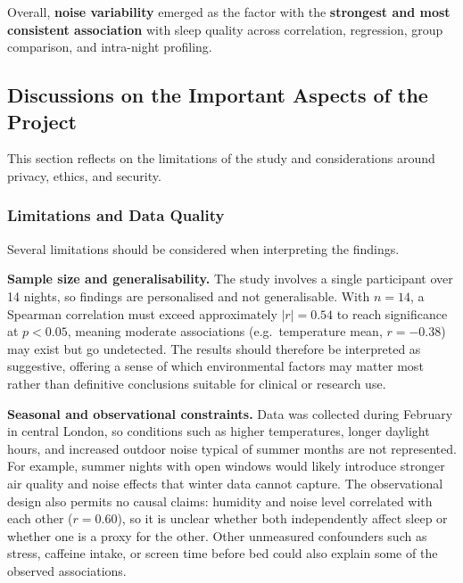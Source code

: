 \documentclass[10pt,a4paper]{extarticle}
\begin{document}
\begin{tcolorbox}[
  colback=imperialblue!5,
  colframe=imperialblue,
  leftrule=3pt,
  rightrule=0pt,
  toprule=0pt,
  bottomrule=0pt,
  boxsep=4pt,
  left=8pt,
  right=8pt,
  sharp corners
]
Overall, \textbf{noise variability} emerged as the factor with the \textbf{strongest and most consistent association} with sleep quality across correlation, regression, group comparison, and intra-night profiling.
\end{tcolorbox}

\subsection{Discussions on the Important Aspects of the Project}

This section reflects on the limitations of the study and considerations around privacy, ethics, and security.

\subsubsection{Limitations and Data Quality}

Several limitations should be considered when interpreting the findings.

\textbf{Sample size and generalisability.} The study involves a single participant over 14 nights, so findings are personalised and not generalisable. With $n = 14$, a Spearman correlation must exceed approximately $|r| = 0.54$ to reach significance at $p < 0.05$, meaning moderate associations (e.g.\ temperature mean, $r = -0.38$) may exist but go undetected. The results should therefore be interpreted as suggestive, offering a sense of which environmental factors may matter most rather than definitive conclusions suitable for clinical or research use.

\textbf{Seasonal and observational constraints.} Data was collected during February in central London, so conditions such as higher temperatures, longer daylight hours, and increased outdoor noise typical of summer months are not represented. For example, summer nights with open windows would likely introduce stronger air quality and noise effects that winter data cannot capture. The observational design also permits no causal claims: humidity and noise level correlated with each other ($r = 0.60$), so it is unclear whether both independently affect sleep or whether one is a proxy for the other. Other unmeasured confounders such as stress, caffeine intake, or screen time before bed could also explain some of the observed associations.
\end{document}
